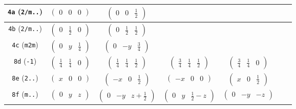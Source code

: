 \documentclass[fleqn,9pt,landscape]{jsarticle}
\begin{document}
\begin{center}
\begin{longtable}{ccccccc}
{\tt 4a} ({\tt 2/m..}) & $ \begin{pmatrix} 0 & 0 & 0 \end{pmatrix} $ & $ \begin{pmatrix} 0 & 0 & \frac{1}{2} \end{pmatrix} $ & $  $ & $  $ & $  $ & $  $ \\ \hline
{\tt 4b} ({\tt 2/m..}) & $ \begin{pmatrix} 0 & \frac{1}{2} & 0 \end{pmatrix} $ & $ \begin{pmatrix} 0 & \frac{1}{2} & \frac{1}{2} \end{pmatrix} $ & $  $ & $  $ & $  $ & $  $ \\ \hline
{\tt 4c} ({\tt m2m}) & $ \begin{pmatrix} 0 & y & \frac{1}{4} \end{pmatrix} $ & $ \begin{pmatrix} 0 & - y & \frac{3}{4} \end{pmatrix} $ & $  $ & $  $ & $  $ & $  $ \\ \hline
{\tt 8d} ({\tt -1}) & $ \begin{pmatrix} \frac{1}{4} & \frac{1}{4} & 0 \end{pmatrix} $ & $ \begin{pmatrix} \frac{1}{4} & \frac{1}{4} & \frac{1}{2} \end{pmatrix} $ & $ \begin{pmatrix} \frac{3}{4} & \frac{1}{4} & \frac{1}{2} \end{pmatrix} $ & $ \begin{pmatrix} \frac{3}{4} & \frac{1}{4} & 0 \end{pmatrix} $ & $  $ & $  $ \\ \hline
{\tt 8e} ({\tt 2..}) & $ \begin{pmatrix} x & 0 & 0 \end{pmatrix} $ & $ \begin{pmatrix} - x & 0 & \frac{1}{2} \end{pmatrix} $ & $ \begin{pmatrix} - x & 0 & 0 \end{pmatrix} $ & $ \begin{pmatrix} x & 0 & \frac{1}{2} \end{pmatrix} $ & $  $ & $  $ \\ \hline
{\tt 8f} ({\tt m..}) & $ \begin{pmatrix} 0 & y & z \end{pmatrix} $ & $ \begin{pmatrix} 0 & - y & z + \frac{1}{2} \end{pmatrix} $ & $ \begin{pmatrix} 0 & y & \frac{1}{2} - z \end{pmatrix} $ & $ \begin{pmatrix} 0 & - y & - z \end{pmatrix} $ & $  $ & $  $ \\ \hline

\end{longtable}
\end{center}
\end{document}
